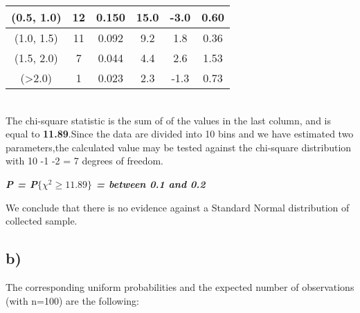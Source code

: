 \documentclass[12pt]{article}
\begin{document}
\begin{tabular}{|c|c|c|c|c|c|}
(0.5, 1.0)         & 12                                                                  & 0.150                                                                           & 15.0                                                                & -3.0                         & 0.60                      \\ \hline
(1.0, 1.5)         & 11                                                                  & 0.092                                                                           & 9.2                                                                 & 1.8                          & 0.36                      \\ \hline
(1.5, 2.0)         & 7                                                                   & 0.044                                                                           & 4.4                                                                 & 2.6                          & 1.53                      \\ \hline
(\textgreater 2.0) & 1                                                                   & 0.023                                                                           & 2.3                                                                 & -1.3                         & 0.73                      \\ \hline
\end{tabular}\\

The chi-square statistic is the sum of of the values in the last column, and is equal to \textbf{11.89}.Since the data are divided into 10 bins and we have estimated two parameters,the calculated value may be tested against the chi-square distribution with 10 -1 -2 = 7 degrees of freedom. \\
\begin{center}
\textit{\textbf{P = P$\lbrace\chi^2\geq11.89\rbrace$ = between 0.1 and 0.2}}
\end{center}
{\large We conclude that there is no evidence against a Standard Normal distribution of collected sample.}



\subsection*{b)}

The corresponding uniform probabilities and the expected number of observations (with n=100) are the following:
\\
\end{document}
